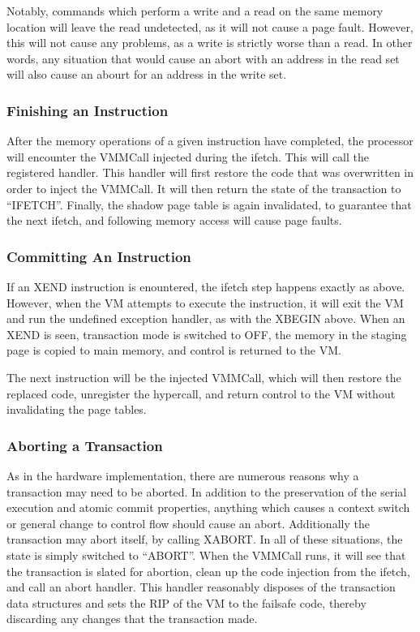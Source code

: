 \documentclass{acm_proc_article-sp}
\begin{document}
Notably, commands which perform a write and a read on the same memory location
will leave the read undetected, as it will not cause a page fault. However,
this will not cause any problems, as a write is strictly worse than a read. In
other words, any situation that would cause an abort with an address in the 
read set will also cause an abourt for an address in the write set.

\subsubsection{Finishing an Instruction}

After the memory operations of a given instruction have completed, the 
processor will encounter the VMMCall injected during the ifetch. This will
call the registered handler. This handler will first restore the code that
was overwritten in order to inject the VMMCall. It will then return the state
of the transaction to ``IFETCH''. Finally, the shadow page table is again 
invalidated, to guarantee that the next ifetch, and following memory access 
will cause page faults.  

\subsubsection{Committing An Instruction}

If an XEND instruction is enountered, the ifetch step happens exactly as above.
However, when the VM attempts to execute the instruction, it will exit the VM
and run the undefined exception handler, as with the XBEGIN above. When an XEND
is seen, transaction mode is switched to OFF, the memory in the staging page is
copied to main memory, and control is returned to the VM.

The next instruction will be the injected VMMCall, which will then restore the
replaced code, unregister the hypercall, and return control to the VM without
invalidating the page tables.

\subsubsection{Aborting a Transaction}

As in the hardware implementation, there are numerous reasons why a transaction
may need to be aborted. In addition to the preservation of the serial execution
and atomic commit properties, anything which causes a context switch or general
change to control flow should cause an abort. Additionally the transaction may
abort itself, by calling XABORT. In all of these situations, the state is 
simply switched to ``ABORT''. When the VMMCall runs, it will see that the 
transaction is slated for abortion, clean up the code injection from the ifetch,
and call an abort handler. This handler reasonably disposes of the transaction
data structures and sets the RIP of the VM to the failsafe code, thereby
discarding any changes that the transaction made. 
\end{document}
